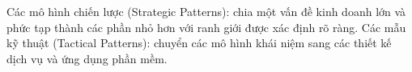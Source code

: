 Các mô hình chiến lược (Strategic Patterns): chia một vấn đề kinh doanh lớn và phức tạp thành các phần nhỏ hơn với ranh giới được xác định rõ ràng.
Các mẫu kỹ thuật (Tactical Patterns): chuyển các mô hình khái niệm sang các thiết kế dịch vụ và ứng dụng phần mềm.




